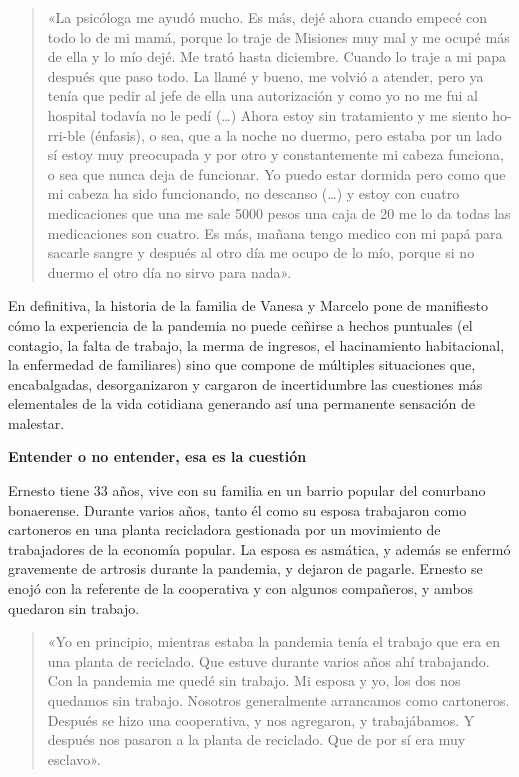 \begin{quote}
«La psicóloga me ayudó mucho. Es más, dejé ahora cuando empecé con todo lo de mi mamá, porque lo traje de Misiones muy mal y me ocupé más de ella y lo mío dejé. Me trató hasta diciembre. Cuando lo traje a mi papa después que paso todo. La llamé y bueno, me volvió a atender, pero ya tenía que pedir al jefe de ella una autorización y como yo no me fui al hospital todavía no le pedí (\ldots) Ahora estoy sin tratamiento y me siento ho-rri-ble (énfasis), o sea, que a la noche no duermo, pero estaba por un lado sí estoy muy preocupada y por otro y constantemente mi cabeza funciona, o sea que nunca deja de funcionar. Yo puedo estar dormida pero como que mi cabeza ha sido funcionando, no descanso (\ldots) y estoy con cuatro medicaciones que una me sale 5000 pesos una caja de 20 me lo da todas las medicaciones son cuatro. Es más, mañana tengo medico con mi papá para sacarle sangre y después al otro día me ocupo de lo mío, porque si no duermo el otro día no sirvo para nada».
\end{quote}

En definitiva, la historia de la familia de Vanesa y Marcelo pone de manifiesto cómo la experiencia de la pandemia no puede ceñirse a hechos puntuales (el contagio, la falta de trabajo, la merma de ingresos, el hacinamiento habitacional, la enfermedad de familiares) sino que compone de múltiples situaciones que, encabalgadas, desorganizaron y cargaron de incertidumbre las cuestiones más elementales de la vida cotidiana generando así una permanente sensación de malestar.

\textbf{Entender o no entender, esa es la cuestión}

Ernesto tiene 33 años, vive con su familia en un barrio popular del conurbano bonaerense. Durante varios años, tanto él como su esposa trabajaron como cartoneros en una planta recicladora gestionada por un movimiento de trabajadores de la economía popular. La esposa es asmática, y además se enfermó gravemente de artrosis durante la pandemia, y dejaron de pagarle. Ernesto se enojó con la referente de la cooperativa y con algunos compañeros, y ambos quedaron sin trabajo.

\begin{quote}
«Yo en principio, mientras estaba la pandemia tenía el trabajo que era en una planta de reciclado. Que estuve durante varios años ahí trabajando. Con la pandemia me quedé sin trabajo. Mi esposa y yo, los dos nos quedamos sin trabajo. Nosotros generalmente arrancamos como cartoneros. Después se hizo una cooperativa, y nos agregaron, y trabajábamos. Y después nos pasaron a la planta de reciclado. Que de por sí era muy esclavo».
\end{quote}

